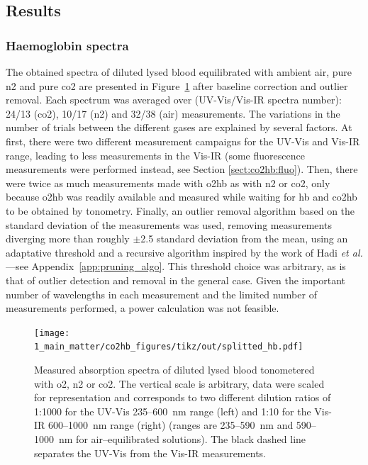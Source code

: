 \subsection{Results}

\subsubsection{Haemoglobin spectra}\label{sect:co2hb:hb_spectra}

The obtained spectra of diluted lysed blood equilibrated with ambient air, pure \gls{n2} and pure \gls{co2} are presented in Figure~\ref{fig:co2hb:splitted_hb} after baseline correction and outlier removal. Each spectrum was averaged over (UV-Vis/Vis-IR spectra number): 24/13 (\gls{co2}), 10/17 (\gls{n2}) and 32/38 (air) measurements. The variations in the number of trials between the different gases are explained by several factors. At first, there were two different measurement campaigns for the UV-Vis and Vis-IR range, leading to less measurements in the Vis-IR (some fluorescence measurements were performed instead, see Section \ref{sect:co2hb:fluo}). Then, there were twice as much measurements made with {\gls{o2hb}} as with {\gls{n2}} or {\gls{co2}}, only because {\gls{o2hb}} was readily available and measured while waiting for {\gls{hb}} and {\gls{co2hb}} to be obtained by tonometry. Finally, an outlier removal algorithm based on the standard deviation of the measurements was used, removing measurements diverging more than roughly {$\pm$}2.5 standard deviation from the mean, using an adaptative threshold and a recursive algorithm inspired by the work of Hadi \textit{et al.}{\cite{hadi1992}}---see Appendix~\ref{app:pruning_algo}. This threshold choice was arbitrary, as is that of outlier detection and removal in the general case{\cite{aguinis2013}}. Given the important number of wavelengths in each measurement and the limited number of measurements performed, a power calculation was not feasible.

\begin{figure}
	\centering
		\texttt{[image: 1\_main\_matter/co2hb\_figures/tikz/out/splitted\_hb.pdf]}
	\caption[Measured absorption spectra of diluted lysed blood tonometered with \gls{o2}, \gls{n2} or \gls{co2}]{Measured absorption spectra of diluted lysed blood tonometered with \gls{o2}, \gls{n2} or \gls{co2}. The vertical scale is arbitrary, data were scaled for representation and corresponds to two different dilution ratios of 1:1000 for the UV-Vis 235--600~nm range (left) and 1:10 for the Vis-IR 600--1000~nm range (right) (ranges are 235--590~nm and 590--1000~nm for air--equilibrated solutions). The black dashed line separates the UV-Vis from the Vis-IR measurements.}
	\label{fig:co2hb:splitted_hb}
\end{figure}

